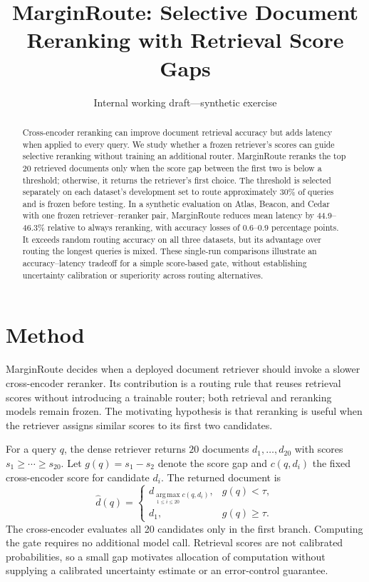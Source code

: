 \documentclass[11pt]{article}
\title{MarginRoute: Selective Document Reranking with Retrieval Score Gaps}
\author{}
\date{Internal working draft---synthetic exercise}
\begin{document}
\maketitle

\begin{abstract}
Cross-encoder reranking can improve document retrieval accuracy but adds latency when applied to every query. We study whether a frozen retriever's scores can guide selective reranking without training an additional router. MarginRoute reranks the top 20 retrieved documents only when the score gap between the first two is below a threshold; otherwise, it returns the retriever's first choice. The threshold is selected separately on each dataset's development set to route approximately 30\% of queries and is frozen before testing. In a synthetic evaluation on Atlas, Beacon, and Cedar with one frozen retriever--reranker pair, MarginRoute reduces mean latency by 44.9--46.3\% relative to always reranking, with accuracy losses of 0.6--0.9 percentage points. It exceeds random routing accuracy on all three datasets, but its advantage over routing the longest queries is mixed. These single-run comparisons illustrate an accuracy--latency tradeoff for a simple score-based gate, without establishing uncertainty calibration or superiority across routing alternatives.
\end{abstract}

\section{Method}
\label{sec:method}
MarginRoute decides when a deployed document retriever should invoke a slower cross-encoder reranker. Its contribution is a routing rule that reuses retrieval scores without introducing a trainable router; both retrieval and reranking models remain frozen. The motivating hypothesis is that reranking is useful when the retriever assigns similar scores to its first two candidates.

For a query $q$, the dense retriever returns $20$ documents $d_1,\ldots,d_{20}$ with scores $s_1\geq\cdots\geq s_{20}$. Let $g(q)=s_1-s_2$ denote the score gap and $c(q,d_i)$ the fixed cross-encoder score for candidate $d_i$. The returned document is
\begin{equation}
\widehat d(q)=
\begin{cases}
d_{\operatorname*{arg\,max}_{1\leq i\leq20} c(q,d_i)}, & g(q)<\tau,\\
d_1, & g(q)\geq\tau.
\end{cases}
\label{eq:marginroute}
\end{equation}
The cross-encoder evaluates all 20 candidates only in the first branch. Computing the gate requires no additional model call. Retrieval scores are not calibrated probabilities, so a small gap motivates allocation of computation without supplying a calibrated uncertainty estimate or an error-control guarantee.
\end{document}
